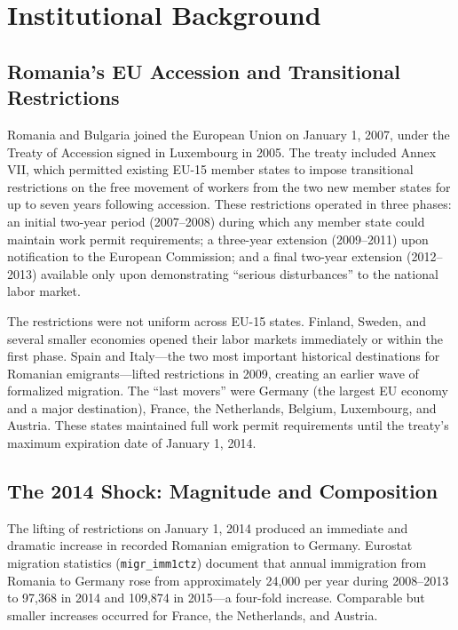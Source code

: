 \documentclass[12pt]{article}
\begin{document}
\section{Institutional Background}

\subsection{Romania's EU Accession and Transitional Restrictions}

Romania and Bulgaria joined the European Union on January 1, 2007, under the Treaty of Accession signed in Luxembourg in 2005. The treaty included Annex VII, which permitted existing EU-15 member states to impose transitional restrictions on the free movement of workers from the two new member states for up to seven years following accession. These restrictions operated in three phases: an initial two-year period (2007--2008) during which any member state could maintain work permit requirements; a three-year extension (2009--2011) upon notification to the European Commission; and a final two-year extension (2012--2013) available only upon demonstrating ``serious disturbances'' to the national labor market.

The restrictions were not uniform across EU-15 states. Finland, Sweden, and several smaller economies opened their labor markets immediately or within the first phase. Spain and Italy---the two most important historical destinations for Romanian emigrants---lifted restrictions in 2009, creating an earlier wave of formalized migration. The ``last movers'' were Germany (the largest EU economy and a major destination), France, the Netherlands, Belgium, Luxembourg, and Austria. These states maintained full work permit requirements until the treaty's maximum expiration date of January 1, 2014.

\subsection{The 2014 Shock: Magnitude and Composition}

The lifting of restrictions on January 1, 2014 produced an immediate and dramatic increase in recorded Romanian emigration to Germany. Eurostat migration statistics (\texttt{migr\_imm1ctz}) document that annual immigration from Romania to Germany rose from approximately 24,000 per year during 2008--2013 to 97,368 in 2014 and 109,874 in 2015---a four-fold increase. Comparable but smaller increases occurred for France, the Netherlands, and Austria.
\end{document}
